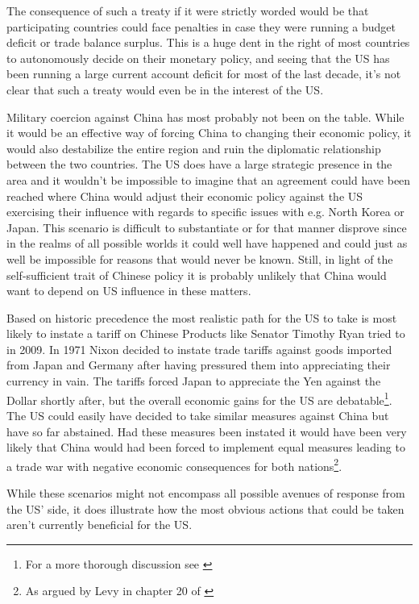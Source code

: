 The consequence of such a treaty if it were strictly worded would be 
that participating countries could face penalties in case they were 
running a budget deficit or trade balance surplus.  This is a huge dent 
in the right of most countries to autonomously decide on their monetary 
policy, and seeing that the US has been running a large current account 
deficit for most of the last decade, it's not clear that such a treaty 
would even be in the interest of the US.

Military coercion against China has most probably not been on the table.  
While it would be an effective way of forcing China to changing their 
economic policy, it would also destabilize the entire region and ruin 
the diplomatic relationship between the two countries. The US does have 
a large strategic presence in the area and it wouldn't be impossible to 
imagine that an agreement could have been reached where China would 
adjust their economic policy against the US exercising their influence 
with regards to specific issues with e.g. North Korea or Japan. This 
scenario is difficult to substantiate or for that manner disprove since 
in the realms of all possible worlds it could well have happened and 
could just as well be impossible for reasons that would never be known.  
Still, in light of the self-sufficient trait of Chinese policy it is 
probably unlikely that China would want to depend on US influence in 
these matters.

Based on historic precedence the most realistic path for the US to take 
is most likely to instate a tariff on Chinese Products like Senator 
Timothy Ryan tried to in 2009. In 1971 Nixon decided to instate trade 
tariffs against goods imported from Japan and Germany after having 
pressured them into appreciating their currency in vain. The tariffs 
forced Japan to appreciate the Yen against the Dollar shortly after, but 
the overall economic gains for the US are debatable\footnote{For a more 
thorough discussion see \cite{kuroda2004}}. The US could easily have 
decided to take similar measures against China but have so far 
abstained. Had these measures been instated it would have been very 
likely that China would had been forced to implement equal measures 
leading to a trade war with negative economic consequences for both 
nations\footnote{As argued by Levy in chapter 20 of \cite{Evenett10}}.

While these scenarios might not encompass all possible avenues of 
response from the US' side, it does illustrate how the most obvious 
actions that could be taken aren't currently beneficial for the US.

